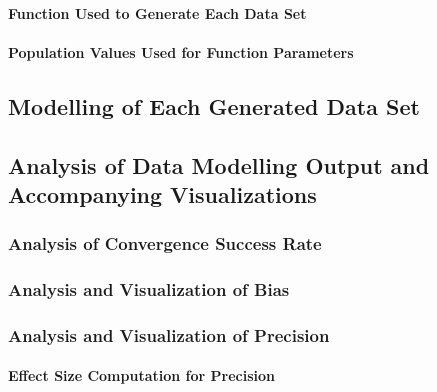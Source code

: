 \documentclass[
12pt, %
twoside,
english]{guelphthesis}
\begin{document}
\hypertarget{function-used-to-generate-each-data-set}{%
\paragraph{Function Used to Generate Each Data Set}\label{function-used-to-generate-each-data-set}}

\hypertarget{population-values-used-for-function-parameters}{%
\paragraph{Population Values Used for Function Parameters}\label{population-values-used-for-function-parameters}}

\hypertarget{data-modelling}{%
\subsection{Modelling of Each Generated Data Set}\label{data-modelling}}

\hypertarget{analysis-visualization}{%
\subsection{Analysis of Data Modelling Output and Accompanying Visualizations}\label{analysis-visualization}}

\hypertarget{convergence-analysis}{%
\subsubsection{Analysis of Convergence Success Rate}\label{convergence-analysis}}

\hypertarget{bias-analysis}{%
\subsubsection{Analysis and Visualization of Bias}\label{bias-analysis}}

\hypertarget{precision-analysis}{%
\subsubsection{Analysis and Visualization of Precision}\label{precision-analysis}}

\hypertarget{effect-size-computation-for-precision}{%
\paragraph{Effect Size Computation for Precision}\label{effect-size-computation-for-precision}}
\end{document}
